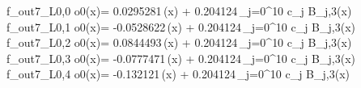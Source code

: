 f_{out7_L0,0	o0}(x)= 0.0295281\,\phi(x) + 0.204124\,\sum_{j=0}^{10} c_j B_{j,3}(x)
f_{out7_L0,1	o0}(x)= -0.0528622\,\phi(x) + 0.204124\,\sum_{j=0}^{10} c_j B_{j,3}(x)
f_{out7_L0,2	o0}(x)= 0.0844493\,\phi(x) + 0.204124\,\sum_{j=0}^{10} c_j B_{j,3}(x)
f_{out7_L0,3	o0}(x)= -0.0777471\,\phi(x) + 0.204124\,\sum_{j=0}^{10} c_j B_{j,3}(x)
f_{out7_L0,4	o0}(x)= -0.132121\,\phi(x) + 0.204124\,\sum_{j=0}^{10} c_j B_{j,3}(x)
